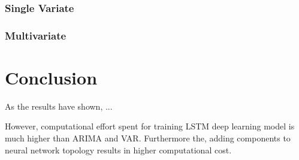 \documentclass[12pt]{article}
\begin{document}
\subsubsection{Single Variate}

\subsubsection{Multivariate}

\section{Conclusion}
As the results have shown, ...

However, computational effort spent for training LSTM deep learning model is
much higher than ARIMA and VAR. Furthermore the, adding components to neural network
topology results in higher computational cost. 

\pagebreak


\end{document}
